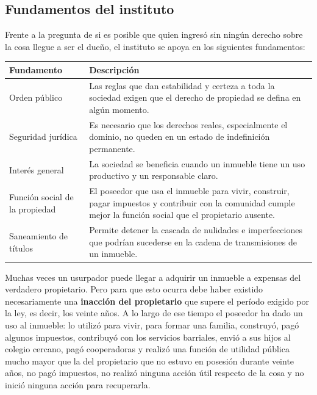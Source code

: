 \documentclass[12pt,oneside]{book}
\begin{document}
\subsection{Fundamentos del instituto}

Frente a la pregunta de si es posible que quien ingresó sin ningún derecho sobre la cosa llegue a ser el dueño, el instituto se apoya en los siguientes fundamentos:

\begin{table}[H]
\centering
\begin{tabularx}{\textwidth}{@{}>{\raggedright\arraybackslash}p{}>{\raggedright\arraybackslash}X@{}}
\toprule
\textbf{Fundamento} & \textbf{Descripción} \\
\midrule
Orden público & Las reglas que dan estabilidad y certeza a toda la sociedad exigen que el derecho de propiedad se defina en algún momento. \\
Seguridad jurídica & Es necesario que los derechos reales, especialmente el dominio, no queden en un estado de indefinición permanente. \\
Interés general & La sociedad se beneficia cuando un inmueble tiene un uso productivo y un responsable claro. \\
Función social de la propiedad & El poseedor que usa el inmueble para vivir, construir, pagar impuestos y contribuir con la comunidad cumple mejor la función social que el propietario ausente. \\
Saneamiento de títulos & Permite detener la cascada de nulidades e imperfecciones que podrían sucederse en la cadena de transmisiones de un inmueble. \\
\bottomrule
\end{tabularx}
\end{table}

Muchas veces un usurpador puede llegar a adquirir un inmueble a expensas del verdadero propietario. Pero para que esto ocurra debe haber existido necesariamente una \textbf{inacción del propietario} que supere el período exigido por la ley, es decir, los veinte años. A lo largo de ese tiempo el poseedor ha dado un uso al inmueble: lo utilizó para vivir, para formar una familia, construyó, pagó algunos impuestos, contribuyó con los servicios barriales, envió a sus hijos al colegio cercano, pagó cooperadoras y realizó una función de utilidad pública mucho mayor que la del propietario que no estuvo en posesión durante veinte años, no pagó impuestos, no realizó ninguna acción útil respecto de la cosa y no inició ninguna acción para recuperarla.
\end{document}
